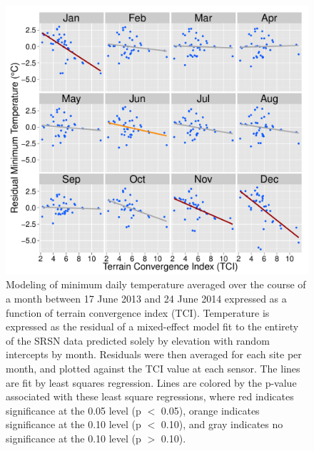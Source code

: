 \documentclass{ametsoc}
\begin{document}
\begin{figure}[ht]

\centerline{\includegraphics[width=39pc]{figure05_tci-elev-resid.pdf}}

 \caption{Modeling of minimum daily temperature averaged over the course of a month between 17 June 2013 and 24 June 2014 expressed as a function of terrain convergence index (TCI). Temperature is expressed as the residual of a mixed-effect model fit to the entirety of the SRSN data predicted solely by elevation with random intercepts by month. Residuals were then averaged for each site per month, and plotted against the TCI value at each sensor. The lines are fit by least squares regression. Lines are colored by the p-value associated with these least square regressions, where red indicates significance at the 0.05 level (p $<$ 0.05), orange indicates significance at the 0.10 level (p $<$ 0.10), and gray indicates no significance at the 0.10 level (p $>$ 0.10).}\label{fig:5}

\end{figure}
\end{document}
